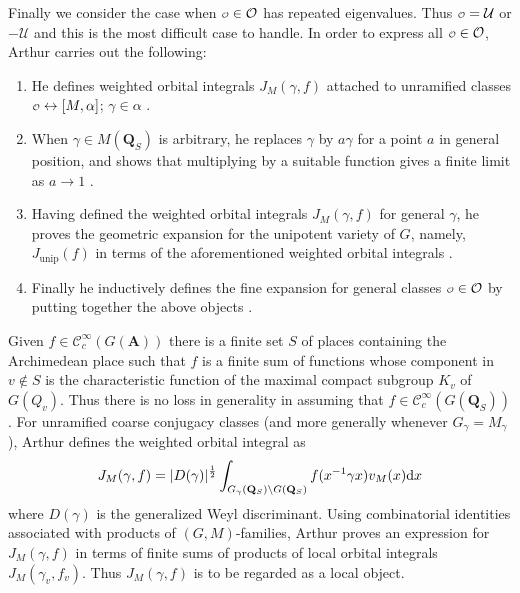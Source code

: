 \documentclass[11pt]{amsart}
\def\A{\mathbf A}
\def\Q{\mathbf Q}
\def\CCC{\mathcal C}
\def\O{\mathcal O}
\def\o{\scalebox{0.8}{$\scriptstyle\mathcal{O}$}}
\def\UUU{\mathcal U}
\def\cb#1{{\color{blue}#1}}
\def\d{\text d}
\def\bs{\setminus} 			%
\def\mod#1{\lvert #1 \rvert} %
\theoremstyle{remark}
\begin{document}
\cb{
Finally we consider the case when $\o \in \O$ has repeated eigenvalues. Thus $\o = \UUU$ or $-\UUU$ and this is the most difficult case to handle.} In order to express all $\o \in \O$, Arthur carries out the following:
\begin{enumerate}
	\item He defines weighted orbital integrals $J_M(\gamma, f)$ attached to unramified classes $\o \leftrightarrow [M, \alpha]$; $\gamma \in \alpha$ \cite{MR625344}. 
	\item When $\gamma \in M(\Q_S)$ is arbitrary, he replaces $\gamma$ by $a \gamma$ for a point $a$ in general position, and shows that multiplying by a suitable function gives a finite limit as $a \to 1$ \cite{MR932848}.
	\item Having defined the weighted orbital integrals $J_M(\gamma, f)$ for general $\gamma$, he proves the geometric expansion for the unipotent variety of $G$, namely, $J_{\text{unip}}(f)$ in terms of the aforementioned weighted orbital integrals \cite{MR828844}. 
	\item Finally he inductively defines the fine expansion for general classes $\o \in \O$ by putting together the above objects \cite{MR835041}.
\end{enumerate}
Given $f \in \CCC_c^\infty(G(\A))$ there is a finite set $S$ of places containing the Archimedean place such that $f$ is a finite sum of functions whose component in $v \not \in S$ is the characteristic function of the maximal compact subgroup $K_v$ of $G(Q_v)$. Thus there is no loss in generality in assuming that $f \in \CCC_c^\infty(G(\Q_S))$. For unramified coarse conjugacy classes (and more generally whenever $G_\gamma = M_\gamma$), Arthur defines the weighted orbital integral as 
\begin{equation} \label{jm}
	J_M(\gamma, f) = \mod{D(\gamma)}^{\frac{1}{2}} \int_{G_\gamma(\Q_S)\bs G(\Q_S)} f(x^{-1}\gamma x) v_M(x) \d x
\end{equation}
where $D(\gamma)$ is the generalized Weyl discriminant. Using combinatorial identities associated with products of $(G, M)$-families, Arthur proves an expression for $J_M(\gamma, f)$ in terms of finite sums of products of local orbital integrals $J_M(\gamma_v, f_v)$. Thus $J_M(\gamma, f)$ is to be regarded as a local object. 
\end{document}
